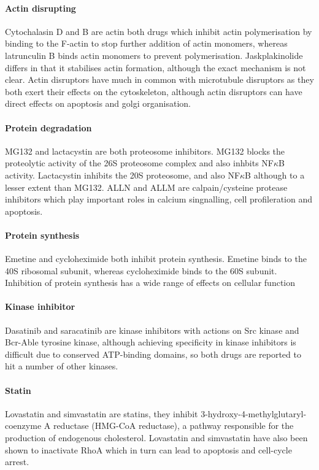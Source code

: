 \documentclass[a4paper,11pt,twoside,openright]{scrbook}
\begin{document}
\paragraph{Actin disrupting}
Cytochalasin D and B are actin both drugs which inhibit actin polymerisation by binding to the F-actin to stop further 
addition of actin monomers, whereas latrunculin B binds actin monomers to prevent polymerisation.
Jaskplakinolide differs in that it stabilises actin formation, although the exact mechanism is not clear.
Actin disruptors have much in common with microtubule disruptors as they both exert their effects on the cytoskeleton, 
although actin disruptors can have direct effects on apoptosis and golgi organisation.

\paragraph{Protein degradation}
MG132 and lactacystin are both proteosome inhibitors.
MG132 blocks the proteolytic activity of the 26S proteosome complex and also inhbits NF$\kappa$B activity.
Lactacystin inhibits the 20S proteosome, and also NF$\kappa$B although to a lesser extent than MG132.
ALLN and ALLM are calpain/cysteine protease inhibitors which play important roles in calcium singnalling, cell 
profileration and apoptosis.

\paragraph{Protein synthesis}
Emetine and cycloheximide both inhibit protein synthesis.
Emetine binds to the 40S ribosomal subunit, whereas cycloheximide binds to the 60S subunit.
Inhibition of protein synthesis has a wide range of effects on cellular function

\paragraph{Kinase inhibitor}
Dasatinib and saracatinib are kinase inhibitors with actions on Src kinase and Bcr-Able tyrosine kinase, although 
achieving specificity in kinase inhibitors is difficult due to conserved ATP-binding domains, so both drugs are 
reported to hit a number of other kinases.

\paragraph{Statin}
Lovastatin and simvastatin are statins, they inhibit 3-hydroxy-4-methylglutaryl-coenzyme A reductase (HMG-CoA 
reductase), a pathway responsible for the production of endogenous cholesterol.
Lovastatin and simvastatin have also been shown to inactivate RhoA which in turn can lead to apoptosis and cell-cycle 
arrest.
\end{document}
